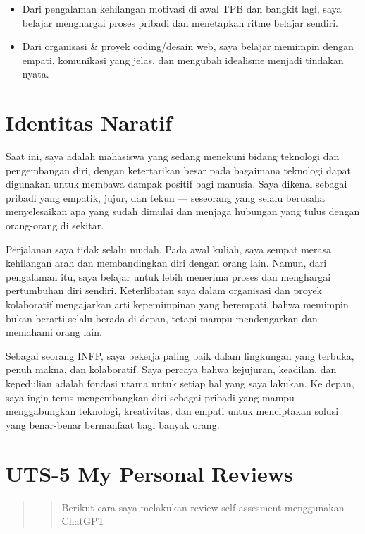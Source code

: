 \documentclass[
  letterpaper,
  DIV=11,
  numbers=noendperiod]{scrreprt}
\begin{document}
\begin{itemize}
\item
  Dari pengalaman kehilangan motivasi di awal TPB dan bangkit lagi, saya
  belajar menghargai proses pribadi dan menetapkan ritme belajar
  sendiri.
\item
  Dari organisasi \& proyek coding/desain web, saya belajar memimpin
  dengan empati, komunikasi yang jelas, dan mengubah idealisme menjadi
  tindakan nyata.
\end{itemize}


\chapter{Identitas Naratif}\label{identitas-naratif}

Saat ini, saya adalah mahasiswa yang sedang menekuni bidang teknologi
dan pengembangan diri, dengan ketertarikan besar pada bagaimana
teknologi dapat digunakan untuk membawa dampak positif bagi manusia.
Saya dikenal sebagai pribadi yang empatik, jujur, dan tekun ---
seseorang yang selalu berusaha menyelesaikan apa yang sudah dimulai dan
menjaga hubungan yang tulus dengan orang-orang di sekitar.

Perjalanan saya tidak selalu mudah. Pada awal kuliah, saya sempat merasa
kehilangan arah dan membandingkan diri dengan orang lain. Namun, dari
pengalaman itu, saya belajar untuk lebih menerima proses dan menghargai
pertumbuhan diri sendiri. Keterlibatan saya dalam organisasi dan proyek
kolaboratif mengajarkan arti kepemimpinan yang berempati, bahwa memimpin
bukan berarti selalu berada di depan, tetapi mampu mendengarkan dan
memahami orang lain.

Sebagai seorang INFP, saya bekerja paling baik dalam lingkungan yang
terbuka, penuh makna, dan kolaboratif. Saya percaya bahwa kejujuran,
keadilan, dan kepedulian adalah fondasi utama untuk setiap hal yang saya
lakukan. Ke depan, saya ingin terus mengembangkan diri sebagai pribadi
yang mampu menggabungkan teknologi, kreativitas, dan empati untuk
menciptakan solusi yang benar-benar bermanfaat bagi banyak orang.


\chapter{UTS-5 My Personal Reviews}\label{uts-5-my-personal-reviews}

\begin{quote}
\begin{quote}
Berikut cara saya melakukan review self assesment menggunakan ChatGPT
\end{quote}
\end{quote}
\end{document}
